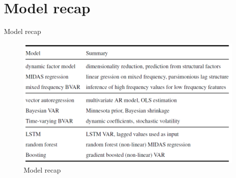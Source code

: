 \section{Model recap}

\begin{frame}{Model recap}
	\begin{figure}[h]
	\centering
	\includegraphics[width=.9\linewidth]{im15}
	\caption{Model recap}
	\label{fig_62_1}
	\end{figure}
\end{frame}